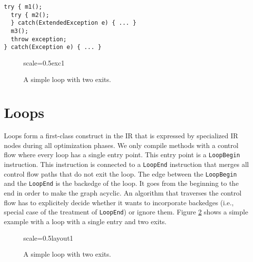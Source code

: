\documentclass[twocolumn]{svjour3}
\newcommand\nodename[1]{\texttt{#1}}
\begin{document}
\begin{lstlisting}[label=lst:exc1, caption=Exception dispatch in the compiler graph., captionpos=b]
try { m1();
  try { m2();
  } catch(ExtendedException e) { ... }
  m3();
  throw exception;
} catch(Exception e) { ... }
\end{lstlisting}

\begin{figure}[ht]
  \centering
\begin{digraphenv}{scale=0.5}{exc1}
\end{digraphenv}
  \caption{A simple loop with two exits.}
  \label{fig:exc1}
\end{figure}

\section{Loops}
\label{sec:loops}
Loops form a first-class construct in the IR that is expressed by specialized IR nodes during all optimization phases.
We only compile methods with a control flow where every loop has a single entry point.
This entry point is a \nodename{LoopBegin} instruction.
This instruction is connected to a \nodename{LoopEnd} instruction that merges all control flow paths that do not exit the loop.
The edge between the \nodename{LoopBegin} and the \nodename{LoopEnd} is the backedge of the loop.
It goes from the beginning to the end in order to make the graph acyclic.
An algorithm that traverses the control flow has to explicitely decide whether it wants to incorporate backedges (i.e., special case of the treatment of \nodename{LoopEnd}) or ignore them.
Figure \ref{fig:loop1} shows a simple example with a loop with a single entry and two exits.

\begin{figure}[ht]
  \centering
\begin{digraphenv}{scale=0.5}{layout1}
\end{digraphenv}
  \caption{A simple loop with two exits.}
  \label{fig:loop1}
\end{figure}
\end{document}
